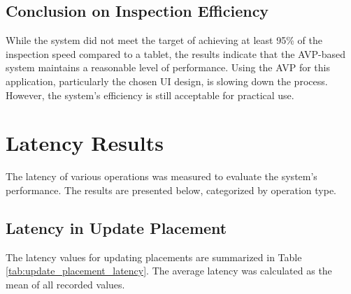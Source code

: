 \subsection{Conclusion on Inspection Efficiency}
While the system did not meet the target of achieving at least 95\% of the inspection speed compared to a tablet, the results indicate that the AVP-based system maintains a reasonable level of performance. Using the AVP for this application, particularly the chosen UI design, is slowing down the process. However, the system's efficiency is still acceptable for practical use.

\section{Latency Results}

The latency of various operations was measured to evaluate the system's performance. The results are presented below, categorized by operation type.

\subsection{Latency in Update Placement}
The latency values for updating placements are summarized in Table \ref{tab:update_placement_latency}. The average latency was calculated as the mean of all recorded values.

